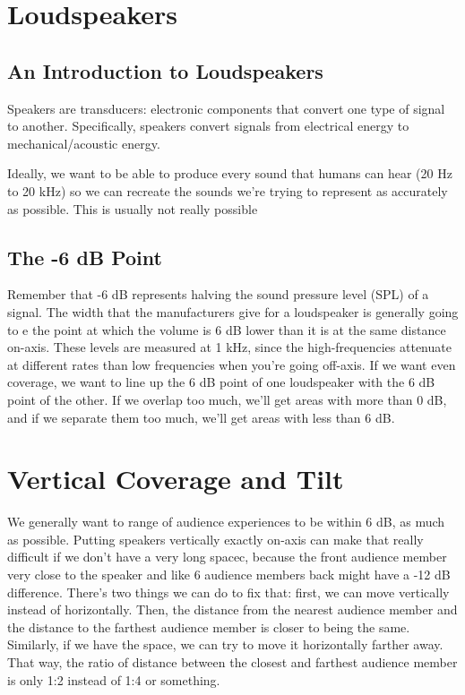 \documentclass[a4paper]{article}
\begin{document}
\section{Loudspeakers}
\subsection{An Introduction to Loudspeakers}
Speakers are transducers: electronic components that convert one type of signal
to another. Specifically, speakers convert signals from electrical energy to
mechanical/acoustic energy.

Ideally, we want to be able to produce every sound that humans can hear (20 Hz
to 20 kHz) so we can recreate the sounds we're trying to represent as
accurately as possible. This is usually not really possible

\subsection{The -6 dB Point}
Remember that -6 dB represents halving the sound pressure level (SPL) of a
signal. The width that the manufacturers give for a loudspeaker is generally
going to e the point at which the volume is 6 dB lower than it is at the same
distance on-axis. These levels are measured at 1 kHz, since the
high-frequencies attenuate at different rates than low frequencies when you're
going off-axis. If we want even coverage, we want to line up the 6 dB point of
one loudspeaker with the 6 dB point of the other. If we overlap too much, we'll
get areas with more than 0 dB, and if we separate them too much, we'll get
areas with less than 6 dB.

\section{Vertical Coverage and Tilt}
We generally want to range of audience experiences to be within 6 dB, as much
as possible. Putting speakers vertically exactly on-axis can make that really
difficult if we don't have a very long spacec, because the front audience
member very close to the speaker and like 6 audience members back might have a
-12 dB difference. There's two things we can do to fix that: first, we can move
vertically instead of horizontally. Then, the distance from the nearest
audience member and the distance to the farthest audience member is closer to
being the same. Similarly, if we have the space, we can try to move it
horizontally farther away. That way, the ratio of distance between the closest
and farthest audience member is only 1:2 instead of 1:4 or something.
\end{document}
